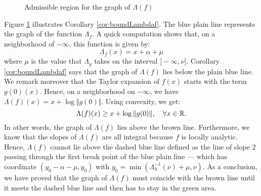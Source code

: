\documentclass{sig-alternate}
\begin{document}
\begin{figure}
\null \hfill
{}
\hfill \null

\caption{Admissible region for the graph of $\Lambda(f)$}
\label{fig:area}
\end{figure}

Figure \ref{fig:area} illustrates Corollary \ref{cor:boundLambdaf}. The 
blue plain line represents the graph of the function $\Lambda_f$. A 
quick computation shows that, on a neighborhood of ${-}\infty$, this 
function is given by:
$$\Lambda_f(x) = x + \alpha + \mu$$
where $\mu$ is the value that $\Lambda_g$ takes on the interval 
$]{-}\infty, \nu]$. Corollary \ref{cor:boundLambdaf} says that the
graph of $\Lambda(f)$ lies below the plain blue line. We remark
moreover that the Taylor expansion of $f(x)$ starts with the term
$g(0)(x)$. Hence, on a neighborhood on ${-}\infty$, we have 
$\Lambda(f)(x) = x + \log \Vert g(0) \Vert$. Using convexity, we 
get:
$$\Lambda(f)(x) \geq x + \log \Vert g(0) \Vert, 
  \quad \forall x \in \mathbb R.$$
In other words, the graph of $\Lambda(f)$ lies above the brown line.
Furthermore, we know that the slopes of $\Lambda(f)$ are all integral
because $f$ is locally analytic. Hence, $\Lambda(f)$ cannot lie above
the dashed blue line defined as the line of slope $2$ passing through
the first break point of the blue plain line --- which has coordinate 
$(y_0 - \alpha - \mu, y_0)$ with $y_0 = \min(\Lambda_h^{-1}(\nu) + \mu, 
\nu)$. As a conclusion, we have proved that the graph of $\Lambda(f)$ 
must coincide with the brown line until it meets the dashed blue line 
and then has to stay in the green area.
\end{document}

